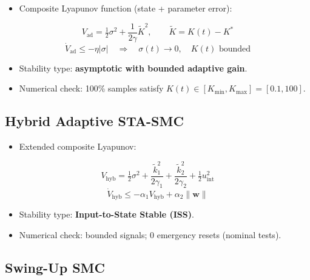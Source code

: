 \documentclass[10pt, a4paper]{article}
\begin{document}
\begin{itemize}[leftmargin=1.5em,itemsep=0.2em]
  \item Composite Lyapunov function (state + parameter error):
\end{itemize}
\begin{equation}
  V_\text{ad} = \tfrac{1}{2}\sigma^2 + \frac{1}{2\gamma}\tilde{K}^2,
  \qquad \tilde{K} = K(t) - K^*
  \label{eq:lyap_adaptive}
\end{equation}
\begin{equation}
  \dot{V}_\text{ad} \leq -\eta|\sigma| \quad \Rightarrow \quad
  \sigma(t) \to 0, \quad K(t) \text{ bounded}
\end{equation}
\begin{itemize}[leftmargin=1.5em,itemsep=0.2em]
  \item Stability type: \textbf{asymptotic with bounded adaptive gain}.
  \item Numerical check: 100\% samples satisfy
  $K(t)\in[K_\text{min},K_\text{max}]=[0.1,100]$.
\end{itemize}

\subsection{Hybrid Adaptive STA-SMC}

\begin{itemize}[leftmargin=1.5em,itemsep=0.2em]
  \item Extended composite Lyapunov:
\end{itemize}
\begin{equation}
  V_\text{hyb} = \tfrac{1}{2}\sigma^2
    + \frac{\tilde{k}_1^2}{2\gamma_1}
    + \frac{\tilde{k}_2^2}{2\gamma_2}
    + \tfrac{1}{2}u_\text{int}^2
\end{equation}
\begin{equation}
  \dot{V}_\text{hyb} \leq -\alpha_1 V_\text{hyb} + \alpha_2\|\bm{w}\|
\end{equation}
\begin{itemize}[leftmargin=1.5em,itemsep=0.2em]
  \item Stability type: \textbf{Input-to-State Stable (ISS)}.
  \item Numerical check: bounded signals; 0 emergency resets (nominal tests).
\end{itemize}

\subsection{Swing-Up SMC}
\end{document}
